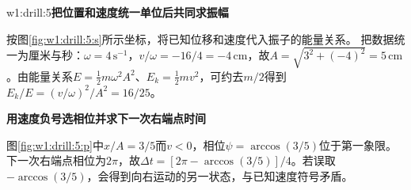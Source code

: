 \begin{drillsolution}{w1:drill:5}\textbf{把位置和速度统一单位后共同求振幅}\par\nobreak
按图\ref{fig:w1:drill:5:s}所示坐标，将已知位移和速度代入振子的能量关系。
把数据统一为厘米与秒：$\omega=4\,\mathrm{s^{-1}}$，$v/\omega=-16/4=-4\,\mathrm{cm}$，故$A=\sqrt{3^2+(-4)^2}=5\,\mathrm{cm}$。由能量关系$E=\frac12m\omega^2A^2$、$E_k=\frac12mv^2$，可约去$m/2$得到$E_k/E=(v/\omega)^2/A^2=16/25$。



\par\medskip{}\noindent\textbf{用速度负号选相位并求下一次右端点时间}\par\nobreak
图\ref{fig:w1:drill:5:p}中$x/A=3/5$而$v<0$，相位$\psi=\arccos(3/5)$位于第一象限。下一次右端点相位为$2\pi$，故$\Delta t=[2\pi-\arccos(3/5)]/4$。若误取$-\arccos(3/5)$，会得到向右运动的另一状态，与已知速度符号矛盾。\end{drillsolution}
